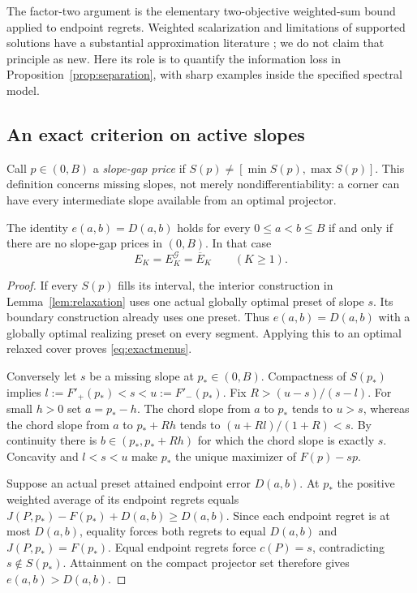 The factor-two argument is the elementary two-objective weighted-sum
bound applied to endpoint regrets. Weighted scalarization and limitations
of supported solutions have a substantial approximation literature
\cite{bazgan2022,helfrich2024}; we do not claim that principle as new. Here its role is
to quantify the information loss in Proposition~\ref{prop:separation},
with sharp examples inside the specified spectral model.

\subsection{An exact criterion on active slopes}
Call $p\in(0,B)$ a \emph{slope-gap price} if
$S(p)\ne[\min S(p),\max S(p)]$. This definition concerns missing slopes,
not merely nondifferentiability: a corner can have every intermediate
slope available from an optimal projector.

\begin{theorem}\label{thm:exactness}
The identity $e(a,b)=D(a,b)$ holds for every $0\le a<b\le B$ if and
only if there are no slope-gap prices in $(0,B)$. In that case
\begin{equation}\label{eq:exactmenus}
 E_K=E_K^{\mathcal G}=\overline E_K\qquad(K\ge1).
\end{equation}
\end{theorem}
\begin{proof}
If every $S(p)$ fills its interval, the interior construction in
Lemma~\ref{lem:relaxation} uses one actual globally optimal preset of
slope $s$. Its boundary construction already uses one preset. Thus
$e(a,b)=D(a,b)$ with a globally optimal realizing preset on every
segment. Applying this to an optimal relaxed cover proves
\eqref{eq:exactmenus}.

Conversely let $s$ be a missing slope at $p_*\in(0,B)$. Compactness of
$S(p_*)$ implies
$l:=F'_+(p_*)<s<u:=F'_-(p_*)$. Fix
$R>(u-s)/(s-l)$. For small $h>0$ set $a=p_*-h$. The chord slope
from $a$ to $p_*$ tends to $u>s$, whereas the chord slope from $a$ to
$p_*+Rh$ tends to $(u+Rl)/(1+R)<s$. By continuity there is
$b\in(p_*,p_*+Rh)$ for which the chord slope is exactly $s$.
Concavity and $l<s<u$ make $p_*$ the unique maximizer of $F(p)-sp$.

Suppose an actual preset attained endpoint error $D(a,b)$. At $p_*$
the positive weighted average of its endpoint regrets equals
$J(P,p_*)-F(p_*)+D(a,b)\ge D(a,b)$. Since each endpoint regret is
at most $D(a,b)$, equality forces both regrets to equal $D(a,b)$
and $J(P,p_*)=F(p_*)$. Equal endpoint regrets force $c(P)=s$,
contradicting $s\notin S(p_*)$. Attainment on the compact projector
set therefore gives $e(a,b)>D(a,b)$.
\end{proof}


